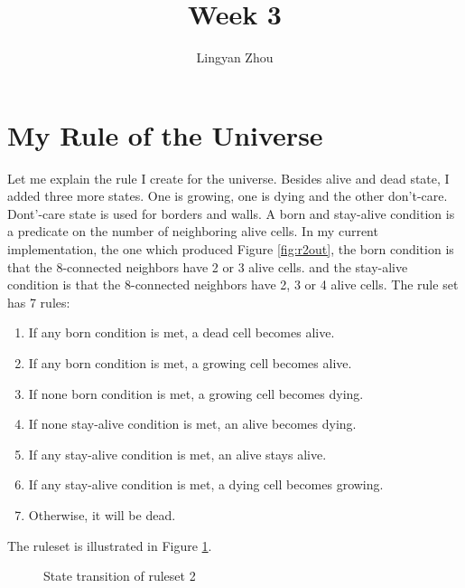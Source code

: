\documentclass[12pt,a4paper]{article}
\author{Lingyan Zhou}
\title{Week 3}
\begin{document}
\maketitle
\tableofcontents
\newpage

\section{My Rule of the Universe}
Let me explain the rule I create for the universe. Besides alive and dead state, I added three more states. One is growing, one is dying and the other don't-care. Dont'-care state is used for borders and walls. A born and stay-alive condition is a predicate on the number of neighboring alive cells. In my current implementation, the one which produced Figure \ref{fig:r2out}, the born condition is that the 8-connected neighbors have 2 or 3 alive cells. and the stay-alive condition is that the 8-connected neighbors have 2, 3 or 4 alive cells.
The rule set has 7 rules:
\begin{enumerate}
\item If any born condition is met, a dead cell becomes alive.
\item If any born condition is met, a growing cell becomes alive.
\item If none born condition is met, a growing cell becomes dying.
\item If none stay-alive condition is met, an alive becomes dying.
\item If any stay-alive condition is met, an alive stays alive.
\item If any stay-alive condition is met, a dying cell becomes growing.
\item Otherwise, it will be dead.
\end{enumerate}
The ruleset is illustrated in Figure \ref{fig:statemachine}.
\begin{figure}[h!]
\caption{\label{fig:statemachine}State transition of ruleset 2}
\end{figure}
\end{document}

